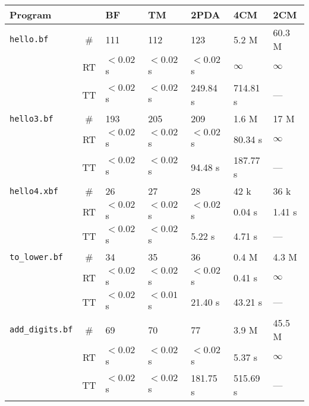 \documentclass[english,shortabstract,mgr]{iithesis}
\begin{document}
\begin{table}[]
\centering
\begin{center}
\begin{tabular}{
  L{2.6cm}c|R{1.7cm}R{1.7cm}R{1.7cm}R{1.7cm}R{1.7cm}
}
\textbf{Program} & & \textbf{BF} & \textbf{TM} & \textbf{2PDA} & \textbf{4CM} & \textbf{2CM} \\
\hline
\texttt{hello.bf} & \# & 111 & 112 & 123 & 5.2 M & 60.3 M\\
 & {\footnotesize{RT}} & $<0.02$ s & $<0.02$ s & $<0.02$ s & $\infty$ & $\infty$ \\
 & {\footnotesize{TT}} & $<0.02$ s & $<0.02$ s & 249.84 s & 714.81 s & --- \\
\hline
\texttt{hello3.bf} & \# & 193 & 205 & 209 & 1.6 M & 17 M\\
 & {\footnotesize{RT}} & $<0.02$ s & $<0.02$ s & $<0.02$ s & 80.34 s & $\infty$ \\
 & {\footnotesize{TT}} & $<0.02$ s & $<0.02$ s & 94.48 s & 187.77 s & --- \\
\hline
\texttt{hello4.xbf} & \# & 26 & 27 & 28 & 42 k & 36 k\\
 & {\footnotesize{RT}} & $<0.02$ s & $<0.02$ s & $<0.02$ s & 0.04 s & 1.41 s \\
 & {\footnotesize{TT}} & $<0.02$ s & $<0.02$ s & 5.22 s & 4.71 s & --- \\
\hline
\texttt{to\_lower.bf} & \# & 34 & 35 & 36 & 0.4 M & 4.3 M\\
 & {\footnotesize{RT}} & $<0.02$ s & $<0.02$ s & $<0.02$ s & 0.41 s & $\infty$ \\
 & {\footnotesize{TT}} & $<0.02$ s & $<0.01$ s & 21.40 s & 43.21 s & --- \\
\hline
\texttt{add\_digits.bf} & \# & 69 & 70 & 77 & 3.9 M & 45.5 M\\
 & {\footnotesize{RT}} & $<0.02$ s & $<0.02$ s & $<0.02$ s & 5.37 s & $\infty$ \\
 & {\footnotesize{TT}} & $<0.02$ s & $<0.02$ s & 181.75 s & 515.69 s & --- \\

\end{tabular}
\end{center}
\end{table}
\end{document}
